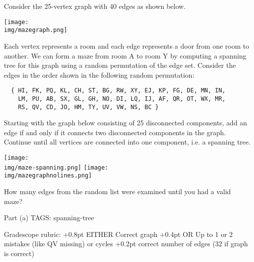 \clearpage
{}

\begin{parts}

%
%
Consider the  25-vertex graph with 40 edges as shown below.

\begin{center}
\texttt{[image: \\img/mazegraph.png]}
\end{center}

Each vertex represents a room and each edge represents a door from one
room to another. We can form a maze from room A to room Y by computing
a spanning tree for this graph using a random permutation of the edge
set. Consider the edges in the order shown in the following random
permutation:

\begin{lstlisting}
  { HI, FK, PQ, KL, CH, ST, BG, RW, XY, EJ, KP, FG, DE, MN, IN,
    LM, PU, AB, SX, GL, GH, NO, DI, LQ, IJ, AF, QR, OT, WX, MR,
    RS, QV, CD, JO, HM, TY, UV, VW, NS, BC }
\end{lstlisting}

Starting with the graph below consisting of 25 disconnected
components, add an edge if and only if it connects two disconnected
components in the graph. Continue until all vertices are connected
into one component, i.e. a spanning tree.

\begin{framed}
\begin{center}
\ifprintanswers
\texttt{[image: \\img/maze-spanning.png]}
\else
\texttt{[image: \\img/mazegraphnolines.png]}
\fi
\end{center}
\smallskip
\end{framed}

\bigskip
How many edges from the random list were examined until you had a valid maze?

\bigskip
\begin{framed}
\medskip
{}
\end{framed}

\RUBRIC
Part (a)
TAGS: spanning-tree

Gradescope rubric:
+0.8pt  EITHER Correct graph
+0.4pt  OR     Up to 1 or 2 mistakes (like QV missing) or cycles
+0.2pt  correct number of edges (32 if graph is correct)


\end{parts}

